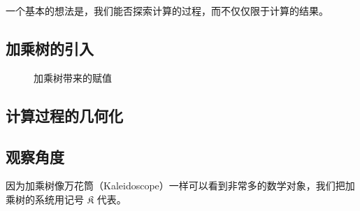 \documentclass[a4paper,12pt]{article}
\begin{document}
一个基本的想法是，我们能否探索计算的过程，而不仅仅限于计算的结果。

\subsection{加乘树的引入}

\begin{figure}[ht]
\centering
{}
\caption{加乘树带来的赋值}
\end{figure}

\subsection{计算过程的几何化}


\subsection{观察角度}

因为加乘树像万花筒（Kaleidoscope）一样可以看到非常多的数学对象，我们把加乘树的系统用记号 $\mathfrak{K}$ 代表。

\newpage
\end{document}
